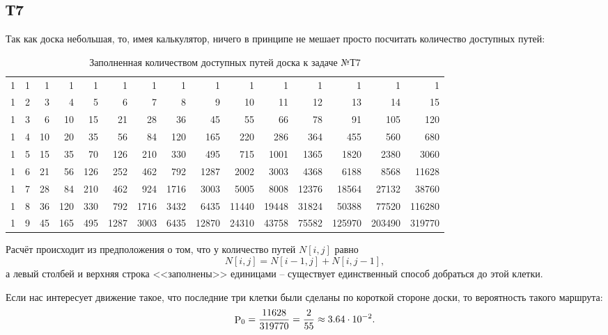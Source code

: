 \subsection*{Т7}

Так как доска небольшая, то, имея калькулятор, ничего в принципе не мешает просто посчитать количество доступных путей:
\begin{table}[h]
\centering
\begin{tabular}{rrrrrrrrrrrrrrr}
\toprule
  1 &   1 &   1 &   1 &   1 &    1 &    1 &    1 &     1 &     1 &     1 &     1 &      1 &      1 &      1 \\
  1 &   2 &   3 &   4 &   5 &    6 &    7 &    8 &     9 &    10 &    11 &    12 &     13 &     14 &     15 \\
  1 &   3 &   6 &  10 &  15 &   21 &   28 &   36 &    45 &    55 &    66 &    78 &     91 &    105 &    120 \\
  1 &   4 &  10 &  20 &  35 &   56 &   84 &  120 &   165 &   220 &   286 &   364 &    455 &    560 &    680 \\
  1 &   5 &  15 &  35 &  70 &  126 &  210 &  330 &   495 &   715 &  1001 &  1365 &   1820 &   2380 &   3060 \\
  1 &   6 &  21 &  56 & 126 &  252 &  462 &  792 &  1287 &  2002 &  3003 &  4368 &   6188 &   8568 &  11628 \\
  1 &   7 &  28 &  84 & 210 &  462 &  924 & 1716 &  3003 &  5005 &  8008 & 12376 &  18564 &  27132 &  38760 \\
  1 &   8 &  36 & 120 & 330 &  792 & 1716 & 3432 &  6435 & 11440 & 19448 & 31824 &  50388 &  77520 & 116280 \\
  1 &   9 &  45 & 165 & 495 & 1287 & 3003 & 6435 & 12870 & 24310 & 43758 & 75582 & 125970 & 203490 & 319770 \\
\bottomrule
\end{tabular}
\caption{Заполненная количеством доступных путей доска к задаче №Т7}
\end{table}

\noindent
Расчёт происходит из предположения о том, что у количество путей $N[i, j]$ равно
\begin{equation*}
    N[i, j] = N[i-1, j] + N[i, j-1],
\end{equation*}
а левый столбей и верхняя строка <<заполнены>> единицами -- существует единственный способ добраться до этой клетки.

Если нас интересует движение такое, что последние три клетки были сделаны по короткой стороне доски, то вероятность такого маршрута:
\begin{equation*}
    \P_0 = \frac{11628}{319770} = \frac{2}{55} \approx 3.64 \cdot 10^{-2}.
\end{equation*}


